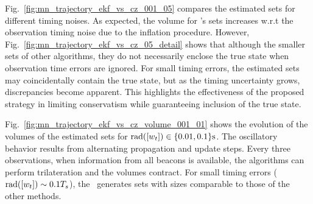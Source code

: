 \documentclass{ifacconf}
\begin{document}
Fig.~\ref{fig:mn_trajectory_ekf_vs_cz_001_05} compares the estimated sets for different timing noises. As expected, the volume for \czesmf's sets increases w.r.t the observation timing noise due to the inflation procedure.
However, Fig.~\ref{fig:mn_trajectory_ekf_vs_cz_05_detail} shows that although the smaller sets of other algorithms, they do not necessarily enclose the true state when observation time errors are ignored.
For small timing errors, the estimated sets may coincidentally contain the true state, but as the timing uncertainty grows, discrepancies become apparent.
This highlights the effectiveness of the proposed strategy in limiting conservatism while guaranteeing inclusion of the true state.

Fig.~\ref{fig:mn_trajectory_ekf_vs_cz_volume_001_01} shows the evolution of the volumes of the estimated sets for ${\rad{[w_t]}\in\{0.01,0.1\}\unit{\s}}$.
The oscillatory behavior results from alternating propagation and update steps. Every three observations, when information from all beacons is available, the algorithms can perform trilateration and the volumes contract. For small timing errors (${\operatorname{rad}([w_{t}])\sim 0.1T_{s}}$), the \czesmf\ generates sets with sizes comparable to those of the other methods.

\end{document}
